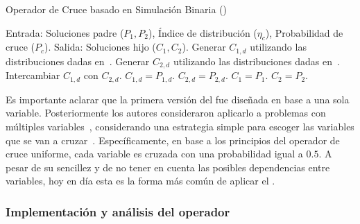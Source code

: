 \begin{algorithm}[t]
\scriptsize
\caption{Operador de Cruce basado en Simulación Binaria (\SBX{})}
\label{alg:SBX_Operator}
\begin{algorithmic}[1]
    \STATE Entrada: Soluciones padre ($P_{1}, P_{2}$), Índice de distribución ($\eta_c$), Probabilidad de cruce ($P_c$).
    \STATE Salida: Soluciones hijo ($C_{1}, C_{2}$).
	 \label{alg:inherit_variable}
		\STATE Generar $C_{1,d}$ utilizando las distribuciones dadas en~\cite{deb1999self}. 
		\STATE Generar $C_{2,d}$ utilizando las distribuciones dadas en~\cite{deb1999self}.
			\STATE Intercambiar $C_{1,d}$ con $C_{2,d}$.
		 \ENDIF
        \ELSE
	   \STATE $C_{1,d} = P_{1, d}$.
	   \STATE $C_{2,d} = P_{2, d}$.
        \ENDIF
       \ENDFOR
    \ELSE
	\STATE $C_{1} = P_{1}$.
	\STATE $C_{2} = P_{2}$.
    \ENDIF
\end{algorithmic}
\end{algorithm}

Es importante aclarar que la primera versión del \SBX{} fue diseñada en base a una sola variable.
%
Posteriormente los autores consideraron aplicarlo a problemas con múltiples variables~\cite{Joel:SBX1994}, considerando
una estrategia simple para escoger las variables que se van a cruzar~\cite{Joel:UNDX}.
%
Específicamente, en base a los principios del operador de cruce uniforme, cada variable es cruzada con una probabilidad igual a $0.5$.
%
A pesar de su sencillez y de no tener en cuenta las posibles dependencias entre variables, hoy en día esta es la forma más común de 
aplicar el \SBX{}.

\subsubsection{Implementación y análisis del operador \SBX{}}

